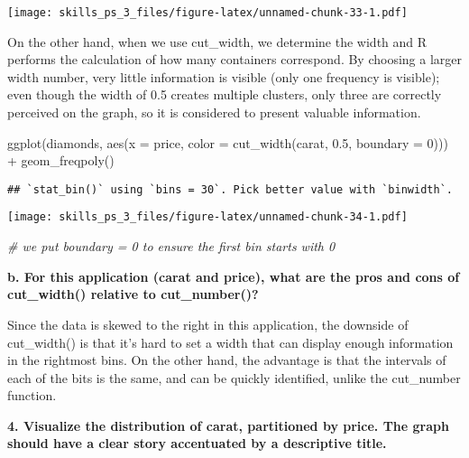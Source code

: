 \documentclass[
]{article}
\newenvironment{Shaded}{\begin{snugshade}}{\end{snugshade}}
\newcommand{\AttributeTok}[1]{\textcolor[rgb]{0.77,0.63,0.00}{#1}}
\newcommand{\CommentTok}[1]{\textcolor[rgb]{0.56,0.35,0.01}{\textit{#1}}}
\newcommand{\DecValTok}[1]{\textcolor[rgb]{0.00,0.00,0.81}{#1}}
\newcommand{\FloatTok}[1]{\textcolor[rgb]{0.00,0.00,0.81}{#1}}
\newcommand{\FunctionTok}[1]{\textcolor[rgb]{0.00,0.00,0.00}{#1}}
\newcommand{\NormalTok}[1]{#1}
\newcommand{\SpecialCharTok}[1]{\textcolor[rgb]{0.00,0.00,0.00}{#1}}
\begin{document}
\texttt{[image: skills\_ps\_3\_files/figure-latex/unnamed-chunk-33-1.pdf]}

On the other hand, when we use cut\_width, we determine the width and R
performs the calculation of how many containers correspond. By choosing
a larger width number, very little information is visible (only one
frequency is visible); even though the width of 0.5 creates multiple
clusters, only three are correctly perceived on the graph, so it is
considered to present valuable information.

\begin{Shaded}
\begin{Highlighting}[]
\FunctionTok{ggplot}\NormalTok{(diamonds, }\FunctionTok{aes}\NormalTok{(}\AttributeTok{x =}\NormalTok{ price, }\AttributeTok{color =} \FunctionTok{cut\_width}\NormalTok{(carat, }\FloatTok{0.5}\NormalTok{, }\AttributeTok{boundary =} \DecValTok{0}\NormalTok{))) }\SpecialCharTok{+} 
    \FunctionTok{geom\_freqpoly}\NormalTok{()}
\end{Highlighting}
\end{Shaded}

\begin{verbatim}
## `stat_bin()` using `bins = 30`. Pick better value with `binwidth`.
\end{verbatim}

\texttt{[image: skills\_ps\_3\_files/figure-latex/unnamed-chunk-34-1.pdf]}

\begin{Shaded}
\begin{Highlighting}[]
\CommentTok{\# we put boundary = 0 to ensure the first bin starts with 0}
\end{Highlighting}
\end{Shaded}

\textbf{b. For this application (carat and price), what are the pros and
cons of cut\_width() relative to cut\_number()?}

Since the data is skewed to the right in this application, the downside
of cut\_width() is that it's hard to set a width that can display enough
information in the rightmost bins. On the other hand, the advantage is
that the intervals of each of the bits is the same, and can be quickly
identified, unlike the cut\_number function.

\textbf{4. Visualize the distribution of carat, partitioned by price.
The graph should have a clear story accentuated by a descriptive title.}
\end{document}
